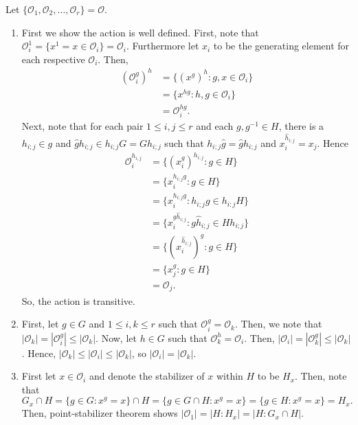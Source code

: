 \documentclass[a4paper]{article}
\begin{document}
\begin{solution}
Let \(\{\mathscr{O}_{1}, \mathscr{O}_{2}, \ldots, \mathscr{O}_{r}\} = \mathscr{O}\).
\begin{enumerate}
	\item First we show the action is well defined. First, note that \(\mathscr{O}_{i} ^{ 1} = \{x^{1} = x \in \mathscr{O}_{i}\} = \mathscr{O}_{i} \). Furthermore let \(x_{i}\) to be the generating element for each respective \(\mathscr{O}_{i}\). Then,
		\begin{align*}
			\left( \mathscr{O}_{i}^{g} \right) ^{h} &= \{\left( x^{g} \right)^{h}:g, x \in \mathscr{O}_{i}  \} \\
&= \{x^{hg}: h, g \in \mathscr{O}_{i}\}  \\
&= \mathscr{O}_{i}^{hg}
		.\end{align*}
		Next, note that for each pair \(1 \le i, j \le r\) and each \(g, g^{-1} \in H\), there is a \(h_{i;j} \in g\) and \(\hat{g}{h}_{i;j} \in h_{i ; j}G = Gh_{i;j}\) such that \(h_{i;j}\hat{g} = \hat{g}{h}_{i;j}\) and \(x_{i}^{\hat{h}_{i;j}} = x_{j}\). Hence
		\begin{align*}
			\mathscr{O}_{i}^{h_{i, j}} &= \{\left( x_{i}^{g} \right)^{h_{i; j}} : g \in H \} \\
						   &= \{x_{i}^{h_{i; j} g} : g \in H\}\\
						   &= \{x_{i} ^{h_{i;j}g} :  h_{i;j} g \in h_{i:j} H\}  \\
						   &= \{x_{i} ^{g\hat{h}_{i;j}} :  g\hat{h}_{i;j} \in  H h_{i; j}\} \\
						   &=  \{\left( x_{i}^{\hat{h}_{i;j}} \right)^{g} : g \in H \}  \\
						   &= \{x_{j}^{g} : g \in H\}  \\
						   &= \mathscr{O}_{j}
		.\end{align*}
So, the action is transitive.
\item First, let \(g \in G\) and \(1 \le i, k \le r\) such that \(\mathscr{O}_{i} ^{g} = \mathscr{O}_{k}\). Then, we note that \(\left| \mathscr{O}_{k} \right| = \left| \mathscr{O}_{i}^{g} \right| \le \left|\mathscr{O}_{k}\right|\). Now, let \(h \in G\) such that \(\mathscr{O}_{k}^{h} = \mathscr{O}_{i}\). Then, \(\left| \mathscr{O}_{i} \right| = \left| \mathscr{O}_{k}^{g} \right|  \le \left| \mathscr{O}_{k} \right| \). Hence, \(\left| \mathscr{O}_{k} \right|  \le \left| \mathscr{O}_{i} \right| \le \left| \mathscr{O}_{k} \right| \), so \(\left| \mathscr{O}_{i} \right| = \left| \mathscr{O}_{k} \right| \).
\item First let \(x \in \mathscr{O}_{i}\) and denote the stabilizer of \(x\) within \(H\) to be \(H_{x}\). Then, note that \[G_{x} \cap H= \{g \in G : x^{g} = x\} \cap H = \{g \in G \cap H : x^{g} = x\} = \{ g\in H : x^{g} = x\} = H_{x}.\] Then, point-stabilizer theorem shows \(\left| \mathscr{O}_1 \right| = \left| H : H_{x} \right| = \left| H : G_{x} \cap H \right|  \).\\

\end{enumerate}
\end{solution}
\end{document}
